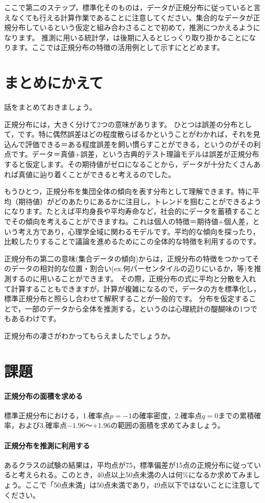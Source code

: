 \documentclass{ltjbook}
\begin{document}
ここで第二のステップ，標準化そのものは，データが正規分布に従っていると言えなくても行える計算作業であることに注意してください。集合的なデータが正規分布しているという仮定と組み合わさることで初めて，推測につかえるようになります。
推測に用いる統計学，は後期に入るとじっくり取り掛かることになります。ここでは正規分布の特徴の活用例として示すにとどめます。

\section{まとめにかえて}
話をまとめておきましょう。

正規分布には，大きく分けて2つの意味があります。
ひとつは誤差の分布として，です。特に偶然誤差はどの程度散らばるかということがわかれば，それを見込んで評価できる＝ある程度誤差を飼い慣らすことができる，というのがその利点です。データ＝真値+誤差，という古典的テスト理論モデルは誤差が正規分布すると仮定します。その期待値がゼロになることから，データが十分たくさんあれば真値に辿り着くことができると考えるのでした。

もうひとつ，正規分布を集団全体の傾向を表す分布として理解できます。特に平均（期待値）がどのあたりにあるかに注目し，トレンドを掴むことができるようになります。たとえば平均身長や平均寿命など，社会的にデータを蓄積することでその傾向を考えることができますね。これは個人の特徴＝期待値+個人差，という考え方であり，心理学全域に関わるモデルです。平均的な傾向を探ったり，比較したりすることで議論を進めるためにこの全体的な特徴を利用するのです。

正規分布の第二の意味(集合データの傾向)からは，正規分布の特徴をつかってそのデータの相対的な位置・割合い(ex.何パーセンタイルの辺りにいるか，等)を推測するのに用いることができます。
その際，正規分布の式に平均と分散を入れて計算することもできますが，計算が複雑になるので，データの方を標準化し，標準正規分布と照らし合わせて解釈することが一般的です。
分布を仮定することで，一部のデータから全体を推測する，というのは心理統計の醍醐味の1つでもあるわけです。

正規分布の凄さがわかってもらえましたでしょうか。
\section{課題}
\paragraph{正規分布の面積を求める}標準正規分布における，1.確率点$p=-1$の確率密度，2.確率点$q=0$までの累積確率，および3.確率点$-1.96$〜$+1.96$の範囲の面積を求めてみましょう。
\paragraph{正規分布を推測に利用する}あるクラスの試験の結果は，平均点が75，標準偏差が15点の正規分布に従っていると考えられる。このとき，40点以上50点未満の人は何\%になるか求めてみましょう。ここで「50点未満」は50点未満であり，49点以下ではないことに注意してください。
\end{document}
